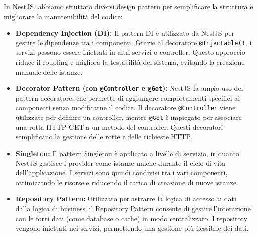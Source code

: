 In NestJS, abbiamo sfruttato diversi design pattern per semplificare la struttura e migliorare la manutenibilità del codice:

\begin{itemize}
  \item \textbf{Dependency Injection (DI):} Il pattern DI è utilizzato da NestJS per gestire le dipendenze tra i componenti. Grazie al decoratore \texttt{@Injectable()}, i servizi possono essere iniettati in altri servizi o controller. Questo approccio riduce il coupling e migliora la testabilità del sistema, evitando la creazione manuale delle istanze.

  \item \textbf{Decorator Pattern (con \texttt{@Controller} e \texttt{@Get}):} NestJS fa ampio uso del pattern decoratore, che permette di aggiungere comportamenti specifici ai componenti senza modificarne il codice. Il decoratore \texttt{@Controller} viene utilizzato per definire un controller, mentre \texttt{@Get} è impiegato per associare una rotta HTTP GET a un metodo del controller. Questi decoratori semplificano la gestione delle rotte e delle richieste HTTP.
  
  \item \textbf{Singleton:} Il pattern Singleton è applicato a livello di servizio, in quanto NestJS gestisce i provider come istanze uniche durante il ciclo di vita dell'applicazione. I servizi sono quindi condivisi tra i vari componenti, ottimizzando le risorse e riducendo il carico di creazione di nuove istanze.

  \item \textbf{Repository Pattern:} Utilizzato per astrarre la logica di accesso ai dati dalla logica di business, il Repository Pattern consente di gestire l'interazione con le fonti dati (come database o cache) in modo centralizzato. I repository vengono iniettati nei servizi, permettendo una gestione più flessibile dei dati.
\end{itemize}

